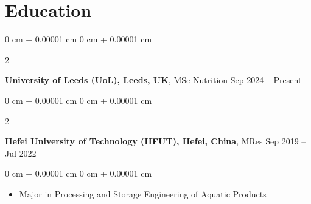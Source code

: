 \documentclass[10pt, letterpaper]{article}
\newenvironment{highlights}{
    \begin{itemize}[
        topsep=0.10 cm,
        parsep=0.10 cm,
        partopsep=0pt,
        itemsep=0pt,
        leftmargin=0 cm + 10pt
    ]
}{
    \end{itemize}
} %
\newenvironment{highlightsforbulletentries}{
    \begin{itemize}[
        topsep=0.10 cm,
        parsep=0.10 cm,
        partopsep=0pt,
        itemsep=0pt,
        leftmargin=10pt
    ]
}{
    \end{itemize}
} %
\newenvironment{onecolentry}{
    \begin{adjustwidth}{
        0 cm + 0.00001 cm
    }{
        0 cm + 0.00001 cm
    }
}{
    \end{adjustwidth}
} %
\newenvironment{twocolentry}[2][]{
    \onecolentry
    \def\secondColumn{#2}
    \setcolumnwidth{\fill, 4.5 cm}
    \begin{paracol}{2}
}{
    \switchcolumn \raggedleft \secondColumn
    \end{paracol}
    \endonecolentry
} %
\newenvironment{header}{
    \setlength{\topsep}{0pt}\par\kern\topsep\centering\linespread{1}
}{
    \par\kern\topsep
} %
\begin{document}
\begin{header}
\begin{comment}
    
    \section{Quick Guide}

    \begin{onecolentry}
        \begin{highlightsforbulletentries}


        \item Each section title is arbitrary and each section contains a list of entries.

        \item There are 7 unique entry types: \textit{BulletEntry}, \textit{TextEntry}, \textit{EducationEntry}, \textit{ExperienceEntry}, \textit{NormalEntry}, \textit{PublicationEntry}, and \textit{OneLineEntry}.

        \item Select a section title, pick an entry type, and start writing your section!

        \item \href{https://docs.rendercv.com/user_guide/}{Here}, you can find a comprehensive user guide for RenderCV.


        \end{highlightsforbulletentries}
    \end{onecolentry}

\end{comment}
    \section{Education}



        
        \begin{twocolentry}{
            Sep 2024 – Present
        }
            \textbf{University of Leeds (UoL), Leeds, UK}, MSc Nutrition\end{twocolentry}

        \vspace{0.10 cm}
       
 \begin{twocolentry}{
            Sep 2019 – Jul 2022
        }
           \textbf{Hefei University of Technology (HFUT), Hefei, China}, MRes\end{twocolentry}

        \vspace{0.10 cm}
        \begin{onecolentry}
            \begin{highlights}
               \item Major in Processing and Storage Engineering of Aquatic Products
            


\end{highlights}
\end{onecolentry}
\end{header}
\end{document}
